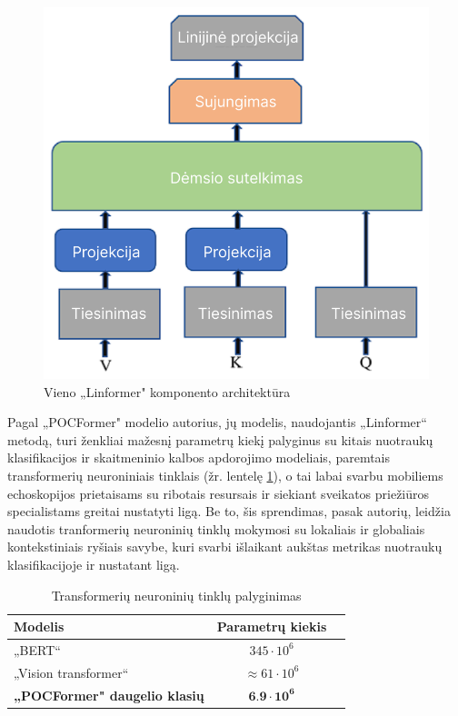 \documentclass[fleqn]{VUMIFKompMagistrinis}
\begin{document}
\begin{figure}[H]
    \centering
    \includegraphics[scale=0.40]{img/linformer.PNG}
    \caption{Vieno „Linformer" komponento architektūra \cite{PAY21}}
    \label{img:linformer}
\end{figure}

\par
Pagal „POCFormer" modelio autorius, jų modelis, naudojantis „Linformer“ metodą, turi ženkliai mažesnį parametrų kiekį palyginus su kitais nuotraukų klasifikacijos ir skaitmeninio kalbos apdorojimo modeliais, paremtais transformerių neuroniniais tinklais (žr. lentelę \ref{tab:parametrai_transf}), o tai labai svarbu mobiliems echoskopijos prietaisams su ribotais resursais ir siekiant sveikatos priežiūros specialistams greitai nustatyti ligą. Be to, šis sprendimas, pasak autorių, leidžia naudotis tranformerių neuroninių tinklų mokymosi su lokaliais ir globaliais kontekstiniais ryšiais savybe, kuri svarbi išlaikant aukštas metrikas nuotraukų klasifikacijoje ir nustatant ligą. \cite{PAY21}

\begin{table}[H]\footnotesize
  \centering
  \caption{Transformerių neuroninių tinklų palyginimas \cite{PAY21, dosovitskiy2021image}}
  \begin{tabular}{|l|c|c|} \hline
    Modelis    & Parametrų kiekis \\
    \hline
    „BERT“ & \( 345 \cdot 10^6 \) \\
    „Vision transformer“ & \( \approx61 \cdot 10^6 \) \\
    \textbf{„POCFormer" daugelio klasių}  & \( \textbf{6.9} \cdot \textbf{10} ^ \textbf{6} \) \\
    \hline
  \end{tabular}
  \label{tab:parametrai_transf}
\end{table}
\end{document}
